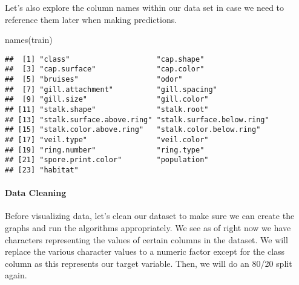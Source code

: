 \documentclass[
]{article}
\newenvironment{Shaded}{\begin{snugshade}}{\end{snugshade}}
\newcommand{\AttributeTok}[1]{\textcolor[rgb]{0.77,0.63,0.00}{#1}}
\newcommand{\ControlFlowTok}[1]{\textcolor[rgb]{0.13,0.29,0.53}{\textbf{#1}}}
\newcommand{\DecValTok}[1]{\textcolor[rgb]{0.00,0.00,0.81}{#1}}
\newcommand{\FunctionTok}[1]{\textcolor[rgb]{0.00,0.00,0.00}{#1}}
\newcommand{\NormalTok}[1]{#1}
\newcommand{\OtherTok}[1]{\textcolor[rgb]{0.56,0.35,0.01}{#1}}
\newcommand{\SpecialCharTok}[1]{\textcolor[rgb]{0.00,0.00,0.00}{#1}}
\begin{document}
Let's also explore the column names within our data set in case we need
to reference them later when making predictions.

\begin{Shaded}
\begin{Highlighting}[]
\FunctionTok{names}\NormalTok{(train)}
\end{Highlighting}
\end{Shaded}

\begin{verbatim}
##  [1] "class"                    "cap.shape"               
##  [3] "cap.surface"              "cap.color"               
##  [5] "bruises"                  "odor"                    
##  [7] "gill.attachment"          "gill.spacing"            
##  [9] "gill.size"                "gill.color"              
## [11] "stalk.shape"              "stalk.root"              
## [13] "stalk.surface.above.ring" "stalk.surface.below.ring"
## [15] "stalk.color.above.ring"   "stalk.color.below.ring"  
## [17] "veil.type"                "veil.color"              
## [19] "ring.number"              "ring.type"               
## [21] "spore.print.color"        "population"              
## [23] "habitat"
\end{verbatim}

\hypertarget{data-cleaning}{%
\paragraph{Data Cleaning}\label{data-cleaning}}

Before visualizing data, let's clean our dataset to make sure we can
create the graphs and run the algorithms appropriately. We see as of
right now we have characters representing the values of certain columns
in the dataset. We will replace the various character values to a
numeric factor except for the class column as this represents our target
variable. Then, we will do an 80/20 split again.

\begin{Shaded}
\end{Shaded}
\end{document}
